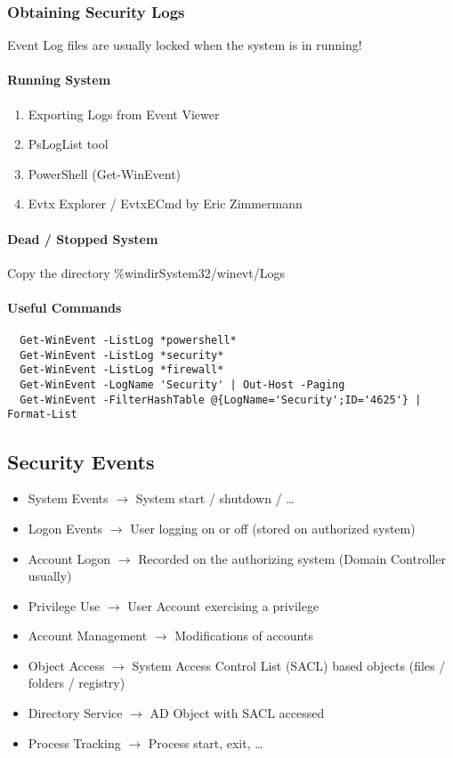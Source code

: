 \subsubsection{Obtaining Security Logs}
Event Log files are usually locked when the system is in running!\\

\paragraph{Running System}
\begin{enumerate}
  \item Exporting Logs from Event Viewer
  \item PsLogList tool
  \item PowerShell (Get-WinEvent)
  \item Evtx Explorer / EvtxECmd by Eric Zimmermann
\end{enumerate}
\paragraph{Dead / Stopped System}
Copy the directory \%windir\/System32/winevt/Logs

\paragraph{Useful Commands}
\begin{lstlisting}
  Get-WinEvent -ListLog *powershell*
  Get-WinEvent -ListLog *security*
  Get-WinEvent -ListLog *firewall*
  Get-WinEvent -LogName 'Security' | Out-Host -Paging
  Get-WinEvent -FilterHashTable @{LogName='Security';ID='4625'} | Format-List
\end{lstlisting}

\subsection{Security Events}
\begin{itemize}
  \item System Events $\rightarrow$ System start / shutdown / \dots
  \item Logon Events $\rightarrow$ User logging on or off (stored on authorized system)
  \item Account Logon $\rightarrow$ Recorded on the authorizing system (Domain Controller usually)
  \item Privilege Use $\rightarrow$ User Account exercising a privilege
  \item Account Management $\rightarrow$ Modifications of accounts
  \item Object Access $\rightarrow$ System Access Control List (SACL) based objects (files / folders / registry)
  \item Directory Service $\rightarrow$ AD Object with SACL accessed
  \item Process Tracking $\rightarrow$ Process start, exit, \dots
\end{itemize}

